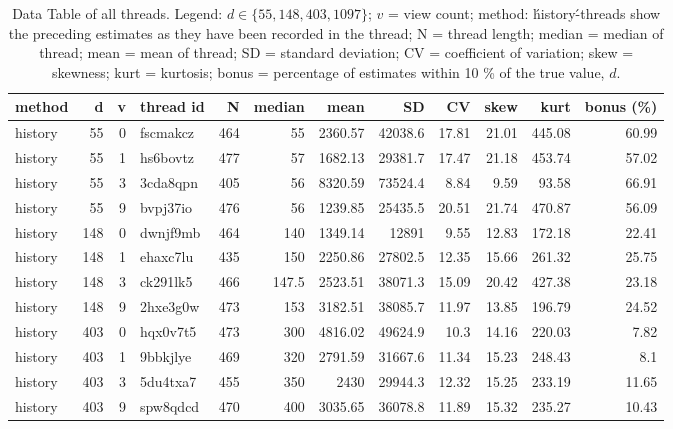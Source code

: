 \documentclass[9pt,a4paper,twocolumn,lineno]{article}
\begin{document}
\begin{table}\centering
\caption{Data Table of all threads. Legend: $d \in \{55, 148, 403, 1097\}$; $v$ = view count; method: \'history\'-threads show the preceding estimates as they have been recorded in the thread; N = thread length; median = median of thread; mean = mean of thread; SD = standard deviation; CV = coefficient of variation; skew = skewness; kurt = kurtosis; bonus = percentage of estimates within 10 \% of the true value, $d$.}

\begin{tabular}{lrrlrrrrrrrr}
\hline
 method   &    d &   v & thread id  &   N &   median &     mean &       SD &    CV &   skew &   kurt &   bonus (\%) \\
\hline
 history  &   55 &   0 & fscmakcz & 464 &     55   &  2360.57 & 42038.6  & 17.81 &  21.01 & 445.08 &        60.99 \\
 history  &   55 &   1 & hs6bovtz & 477 &     57   &  1682.13 & 29381.7  & 17.47 &  21.18 & 453.74 &        57.02 \\
 history  &   55 &   3 & 3cda8qpn & 405 &     56   &  8320.59 & 73524.4  &  8.84 &   9.59 &  93.58 &        66.91 \\
 history  &   55 &   9 & bvpj37io & 476 &     56   &  1239.85 & 25435.5  & 20.51 &  21.74 & 470.87 &        56.09 \\
 history  &  148 &   0 & dwnjf9mb & 464 &    140   &  1349.14 & 12891    &  9.55 &  12.83 & 172.18 &        22.41 \\
 history  &  148 &   1 & ehaxc7lu & 435 &    150   &  2250.86 & 27802.5  & 12.35 &  15.66 & 261.32 &        25.75 \\
 history  &  148 &   3 & ck291lk5 & 466 &    147.5 &  2523.51 & 38071.3  & 15.09 &  20.42 & 427.38 &        23.18 \\
 history  &  148 &   9 & 2hxe3g0w & 473 &    153   &  3182.51 & 38085.7  & 11.97 &  13.85 & 196.79 &        24.52 \\
 history  &  403 &   0 & hqx0v7t5 & 473 &    300   &  4816.02 & 49624.9  & 10.3  &  14.16 & 220.03 &         7.82 \\
 history  &  403 &   1 & 9bbkjlye & 469 &    320   &  2791.59 & 31667.6  & 11.34 &  15.23 & 248.43 &         8.1  \\
 history  &  403 &   3 & 5du4txa7 & 455 &    350   &  2430    & 29944.3  & 12.32 &  15.25 & 233.19 &        11.65 \\
 history  &  403 &   9 & spw8qdcd & 470 &    400   &  3035.65 & 36078.8  & 11.89 &  15.32 & 235.27 &        10.43 \\

\end{tabular}
\end{table}
\end{document}
